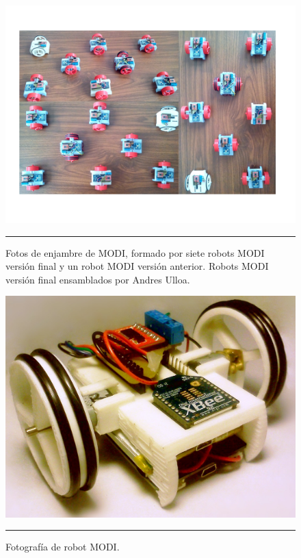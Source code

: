 \begin{figure}[htbp]
	\centering
		\includegraphics[width=\textwidth]{./Figures/MODI/modi_real.png}
		\rule{35em}{0.5pt}
	\caption[MODI Swarm]{Fotos de enjambre de MODI, formado por siete robots MODI versión final y un robot MODI versión anterior. Robots MODI versión final ensamblados por Andres Ulloa.}
	\label{fig:modi real}
\end{figure}


\begin{figure}[htbp]
	\centering
		\includegraphics[width=\textwidth]{./Pictures/modi_photo.jpg}
		\rule{35em}{0.5pt}
	\caption[MODI Detalle]{Fotografía de robot MODI.}
	\label{fig:MODI Detalle}
\end{figure}

